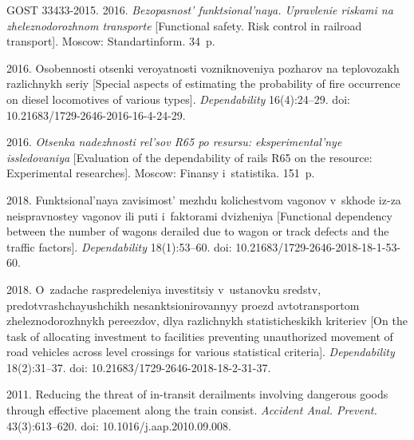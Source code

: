   \begin{multicols}{2}

\renewcommand{\bibname}{\protect\rmfamily References}

{\small\frenchspacing
 {%
 \begin{thebibliography}{99}
GOST 33433-2015. 2016. \textit{Bezopasnost' funktsional'naya. Upravlenie riskami na 
zheleznodorozhnom transporte} [Functional safety. Risk control in railroad transport]. 
Moscow: Standartinform. 34~p.

 2016. Osobennosti 
otsenki veroyatnosti vozniknoveniya pozharov na teplovozakh razlichnykh seriy 
[Special aspects of estimating the probability of fire occurrence on diesel 
locomotives of various types]. \textit{Dependability} 16(4):24--29.
doi: 10.21683/1729-2646-2016-16-4-24-29.

 2016. \textit{Otsenka nadezhnosti rel'sov R65 po resursu: 
eksperimental'nye issledovaniya} [Evaluation of the dependability of rails R65 on the 
resource: Experimental researches]. Moscow: Finansy i~statistika. 151~p.

2018. Funktsional'naya zavisimost' mezhdu kolichestvom vagonov v~skhode iz-za 
neispravnostey vagonov ili puti i~faktorami dvizheniya [Functional dependency 
between the number of wagons derailed due to wagon or track defects and the traffic 
factors]. \textit{Dependability} 18(1):53--60.
doi: 10.21683/1729-2646-2018-18-1-53-60.

 2018. O~zadache raspredeleniya investitsiy 
v~ustanovku sredstv, pred\-ot\-vra\-shcha\-yushchikh nesanktsionirovannyy proezd 
avtotransportom zheleznodorozhnykh pereezdov, dlya razlichnykh statisticheskikh 
kriteriev [On the task of allocating investment to facilities preventing 
unauthorized movement of road vehicles across level crossings for various statistical 
criteria]. \textit{Dependability} 18(2):31--37.
doi: 10.21683/1729-2646-2018-18-2-31-37.

 2011. Reducing the 
threat of in-transit derailments involving dangerous goods through effective placement 
along the train consist. \textit{Accident Anal. Prevent.} 43(3):613--620. 
doi: 10.1016/j.aap.2010.09.008.


\end{thebibliography}}}
\end{multicols}
